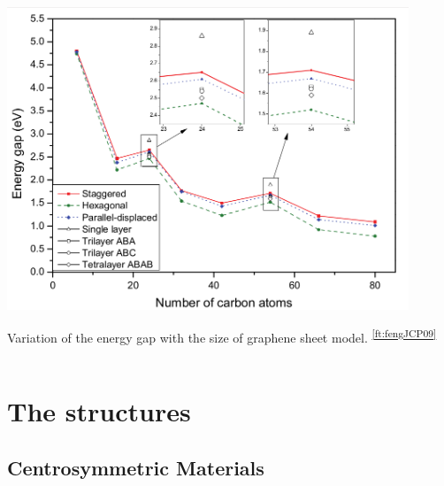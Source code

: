 \documentclass{beamer}
\begin{document}
\begin{frame}
\begin{columns}
\begin{center}
\includegraphics[width=0.9\textwidth]{figs/gap.png}

{\footnotesize Variation of the energy gap with the size of graphene sheet
model.\textsuperscript{ \ref{ft:fengJCP09}}}
\end{center}
    
\end{columns}
\end{frame}





\section{The structures}



\subsection{Centrosymmetric Materials}
\end{document}

